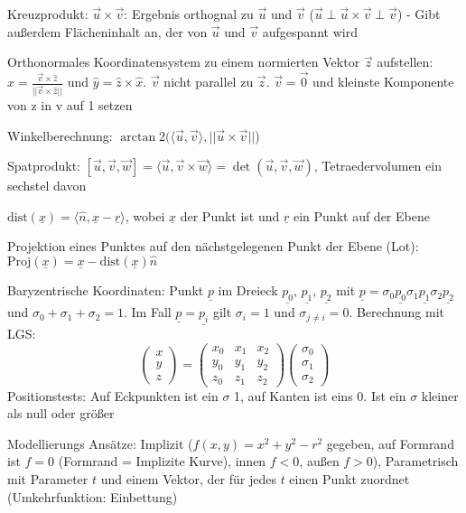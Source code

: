 \documentclass[12pt,landscape]{article}
\begin{document}
\begin{multicols}{3}
\begin{compactitem}
\item Kreuzprodukt: $\vec{u} \times \vec{v}$: Ergebnis orthognal zu $\vec{u}$ und $\vec{v}$ ($\vec{u} \perp \vec{u} \times \vec{v} \perp \vec{v}$) - Gibt außerdem Flächeninhalt an, der von $\vec{u}$ und $\vec{v}$ aufgespannt wird
\item Orthonormales Koordinatensystem zu einem normierten Vektor $\vec{z}$ aufstellen: $\hat{x} = \frac{\vec{v}\times \hat{z}}{||\vec{v} \times \hat{z}||}$ und $\hat{y} = \hat{z} \times \hat{x}$. $\vec{v}$ nicht parallel zu $\vec{z}$. $\vec{v} = \vec{0}$ und kleinste Komponente von z in v auf 1 setzen
\item Winkelberechnung: $\arctan2(\langle \vec{u}, \vec{v} \rangle, ||\vec{u} \times \vec{v}||$)
\item Spatprodukt: $[\vec{u}, \vec{v}, \vec{w}] = \langle \vec{u}, \vec{v} \times \vec{w} \rangle = \det(\vec{u}, \vec{v}, \vec{w})$, Tetraedervolumen ein sechstel davon
\item $\text{dist}(\underline{x}) = \langle \hat{n}, \underline{x} - \underline{r} \rangle$, wobei $\underline{x}$ der Punkt ist und $\underline{r}$ ein Punkt auf der Ebene
\item Projektion eines Punktes auf den nächstgelegenen Punkt der Ebene (Lot): $\text{Proj}(\underline{x}) = \underline{x} - \text{dist}(\underline{x})\hat{n}$ 
\item Baryzentrische Koordinaten: Punkt $\underline{p}$ im Dreieck $\underline{p_0}$, $\underline{p_1}$, $\underline{p_2}$ mit $\underline{p} = \sigma_0 \underline{p_0} \sigma_1 \underline{p_1} \sigma_2 \underline{p_2}$ und $\sigma_0 + \sigma_1 + \sigma_2 = 1$. Im Fall $\underline{p} = \underline{p_i}$ gilt $\sigma_i = 1$ und $\sigma_{j \neq i} = 0$. Berechnung mit LGS:
\[
\begin{pmatrix}x \\ y \\ z\end{pmatrix}
=
\begin{pmatrix}
x_0 & x_1 & x_2 \\
y_0 & y_1 & y_2 \\
z_0 & z_1 & z_2
\end{pmatrix}\begin{pmatrix}
\sigma_0 \\ \sigma_1 \\ \sigma_2
\end{pmatrix}
\] Positionstests: Auf Eckpunkten ist ein $\sigma$ 1, auf Kanten ist eins 0. Ist ein $\sigma$ kleiner als null oder größer
\item Modellierungs Ansätze: Implizit ($f(x,y) = x^2 + y^2 - r^2$ gegeben, auf Formrand ist $f = 0$ (Formrand = Implizite Kurve), innen $f < 0$, außen $f > 0$), Parametrisch mit Parameter $t$ und einem Vektor, der für jedes $t$ einen Punkt zuordnet (Umkehrfunktion: Einbettung)

\end{compactitem}
\end{multicols}
\end{document}
